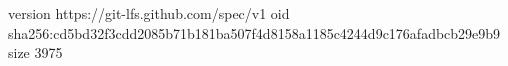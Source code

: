 version https://git-lfs.github.com/spec/v1
oid sha256:cd5bd32f3cdd2085b71b181ba507f4d8158a1185c4244d9c176afadbcb29e9b9
size 3975
